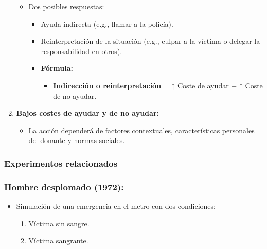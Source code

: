 \documentclass[
]{book}
\providecommand{\tightlist}{%
  \setlength{\itemsep}{0pt}\setlength{\parskip}{0pt}}
\begin{document}
\begin{enumerate}
  \begin{itemize}
  \tightlist
  \item
    Dos posibles respuestas:

    \begin{itemize}
    \tightlist
    \item
      Ayuda indirecta (e.g., llamar a la policía).\\
    \item
      Reinterpretación de la situación (e.g., culpar a la víctima o delegar la responsabilidad en otros).\\
    \item
      \textbf{Fórmula:}

      \begin{itemize}
      \tightlist
      \item
        \textbf{Indirección o reinterpretación} = ↑ Coste de ayudar + ↑ Coste de no ayudar.
      \end{itemize}
    \end{itemize}
  \end{itemize}
\item
  \textbf{Bajos costes de ayudar y de no ayudar:}

  \begin{itemize}
  \tightlist
  \item
    La acción dependerá de factores contextuales, características personales del donante y normas sociales.
  \end{itemize}
\end{enumerate}

\subsubsection{Experimentos relacionados}\label{experimentos-relacionados}

\subsubsection{\texorpdfstring{\textbf{Hombre desplomado (1972):}}{Hombre desplomado (1972):}}\label{hombre-desplomado-1972}

\begin{itemize}
\tightlist
\item
  Simulación de una emergencia en el metro con dos condiciones:

  \begin{enumerate}
  \def\labelenumi{\arabic{enumi}.}
  \tightlist
  \item
    Víctima sin sangre.\\
  \item
    Víctima sangrante.
  \end{enumerate}
\end{itemize}
\end{document}
